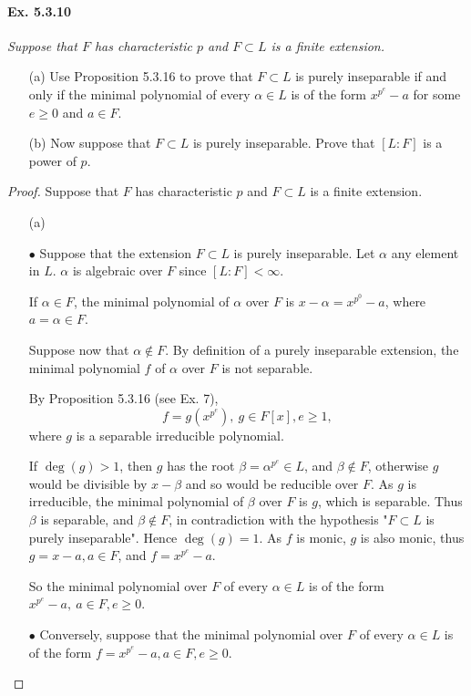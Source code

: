 \documentclass[11pt,a4paper]{article}
\begin{document}
\paragraph{Ex. 5.3.10}

{\it Suppose that $F$ has characteristic $p$ and $F \subset L$ is a finite extension.
\begin{enumerate}
\item[(a)] Use Proposition 5.3.16 to prove that $F\subset L$ is purely inseparable if and only if the minimal polynomial of every $\alpha \in L$ is of the form $x^{p^e} -a$ for some $e\geq 0$ and $a\in F$.
\item[(b)] Now suppose that $F \subset L$ is purely inseparable. Prove that $[L:F]$ is a power of $p$.
\end{enumerate}
}

\begin{proof}
Suppose that $F$ has characteristic $p$ and $F \subset L$ is a finite extension.
\begin{enumerate}
\item[(a)] 

$\bullet$ Suppose that the extension $F \subset L$ is purely inseparable. Let $\alpha$ any element in $L$. $\alpha$ is algebraic over $F$ since $[L : F] < \infty$.

If  $\alpha \in F$, the minimal polynomial of $\alpha$ over $F$ is $x-\alpha = x^{p^0} - a$, where $a = \alpha \in F$. 

Suppose now that $\alpha \not \in F$. By definition of a purely inseparable extension, the minimal polynomial $f$ of $\alpha$ over $F$ is not separable. 

By Proposition 5.3.16 (see Ex. 7),  $${f = g(x^{p^e})},\ g \in F[x], e\geq 1,$$where $g$ is a separable irreducible polynomial.

If $\deg(g)>1$, then $g$ has the root $\beta = \alpha^{p^e} \in L$, and $\beta \not \in F$, otherwise $g$ would be divisible by $x-\beta$ and so would be reducible over $F$. As $g$ is irreducible, the minimal polynomial of $\beta$ over $F$ is $g$, which is separable. Thus $\beta$ is separable, and $\beta \not \in F$, in contradiction with the hypothesis "$F \subset L$ is purely inseparable". Hence $\deg(g) = 1$. As $f$ is monic, $g$ is also monic, thus $g = x-a, a \in F$, and $f = x^{p^e} -a$.

So the minimal polynomial over $F$ of every $\alpha \in L$ is of the form $x^{p^e} -a,\  a\in F, e\geq 0$.

$\bullet$ Conversely, suppose that the minimal polynomial over $F$ of every $\alpha \in L$ is of the form $f=x^{p^e} -a, a\in F, e\geq 0$.


\end{enumerate}
\end{proof}
\end{document}
